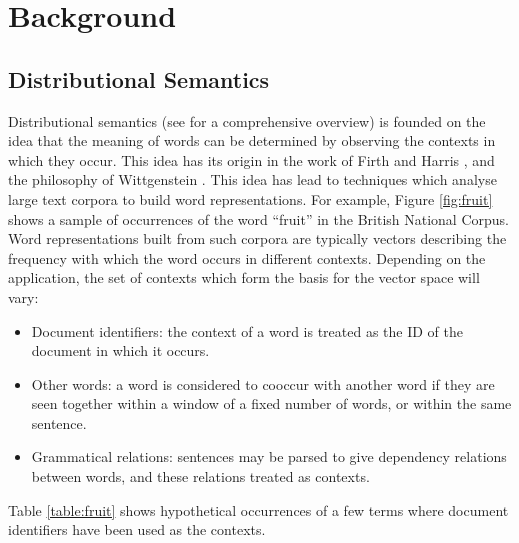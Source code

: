 \documentclass[journal]{IEEEtran}
\theoremstyle{definition}
\begin{document}

\section{Background}

\subsection{Distributional Semantics}

Distributional semantics (see \cite{Turney:10} for a comprehensive
overview) is founded on the idea that the meaning of words can be
determined by observing the contexts in which they occur. This idea
has its origin in the work of Firth \cite{Firth:57} and Harris
\cite{Harris:68}, and the philosophy of Wittgenstein
\cite{Wittgenstein:53}. This idea has lead to techniques which analyse
large text corpora to build word representations. For example, Figure
\ref{fig:fruit} shows a sample of occurrences of the word ``fruit'' in
the British National Corpus. Word representations built from such
corpora are typically vectors describing the frequency with which the
word occurs in different contexts. Depending on the application, the
set of contexts which form the basis for the vector space will vary:
\begin{itemize}
\item Document identifiers: the context of a word is treated as the ID
  of the document in which it occurs.
\item Other words: a word is considered to cooccur with another word
  if they are seen together within a window of a fixed number of
  words, or within the same sentence.
\item Grammatical relations: sentences may be parsed to give
  dependency relations between words, and these relations treated as
  contexts.
\end{itemize}
Table \ref{table:fruit} shows hypothetical occurrences of a few terms
where document identifiers have been used as the contexts.
\end{document}
